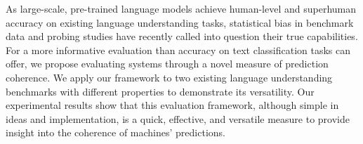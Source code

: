 As large-scale, pre-trained language models achieve human-level and superhuman accuracy on existing language understanding tasks, statistical bias in benchmark data and probing studies have recently called into question their true capabilities. For a more informative evaluation than accuracy on text classification tasks can offer, we propose evaluating systems through a novel measure of prediction coherence. We apply our framework to two existing language understanding benchmarks with different properties to demonstrate its versatility. Our experimental results show that this evaluation framework, although simple in ideas and implementation, is a quick, effective, and versatile measure to provide insight into the coherence of machines' predictions.
